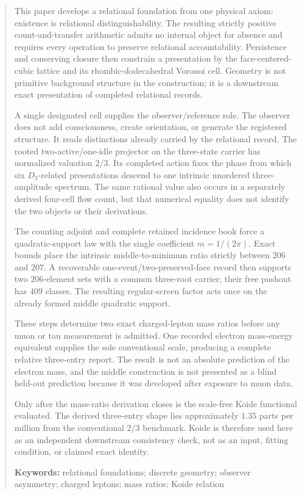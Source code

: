 \documentclass[11pt]{article}
\begin{document}
\begin{abstract}
This paper develops a relational foundation from one physical axiom: existence is relational distinguishability. The resulting strictly positive count-and-transfer arithmetic admits no internal object for absence and requires every operation to preserve relational accountability. Persistence and conserving closure then constrain a presentation by the face-centered-cubic lattice and its rhombic-dodecahedral Voronoi cell. Geometry is not primitive background structure in the construction; it is a downstream exact presentation of completed relational records.

A single designated cell supplies the observer/reference role. The observer does not add consciousness, create orientation, or generate the registered structure. It reads distinctions already carried by the relational record. The rooted two-active/one-idle projector on the three-state carrier has normalized valuation \(2/3\). Its completed action fixes the phase from which six \(D_3\)-related presentations descend to one intrinsic unordered three-amplitude spectrum. The same rational value also occurs in a separately derived four-cell flow count, but that numerical equality does not identify the two objects or their derivations.

The counting adjoint and complete retained incidence book force a quadratic-support law with the single coefficient \(m=1/(2\pi)\). Exact bounds place the intrinsic middle-to-minimum ratio strictly between \(206\) and \(207\). A recoverable one-event/two-preserved-face record then supports two \(206\)-element sets with a common three-root carrier; their free pushout has \(409\) classes. The resulting regular-screen factor acts once on the already formed middle quadratic support.

These steps determine two exact charged-lepton mass ratios before any muon or tau measurement is admitted. One recorded electron mass-energy equivalent supplies the sole conventional scale, producing a complete relative three-entry report. The result is not an absolute prediction of the electron mass, and the middle construction is not presented as a blind held-out prediction because it was developed after exposure to muon data.

Only after the mass-ratio derivation closes is the scale-free Koide functional evaluated. The derived three-entry shape lies approximately \(1.35\) parts per million from the conventional \(2/3\) benchmark. Koide is therefore used here as an independent downstream consistency check, not as an input, fitting condition, or claimed exact identity.

\textbf{Keywords:} relational foundations; discrete geometry; observer asymmetry; charged leptons; mass ratios; Koide relation


\end{abstract}
\end{document}
